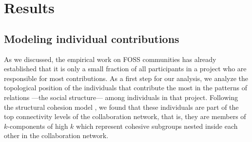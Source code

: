 \section{Results}

\subsection{Modeling individual contributions}

As we discussed, the empirical work on FOSS communities has already established that it is only a small fraction of all participants in a project who are responsible for most contributions. As a first step for our analysis, we analyze the topological position of the individuals that contribute the most in the patterns of relations ---the social structure--- among individuals in that project. Following the structural cohesion model \citep{moody:2003}, we found that these individuals are part of the top connectivity levels of the collaboration network, that is, they are members of $k$-components of high $k$ which represent cohesive subgroups nested inside each other in the collaboration network. 

